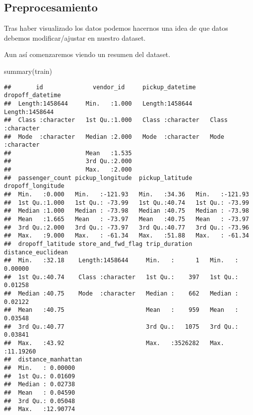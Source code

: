 \documentclass[
]{article}
\newenvironment{Shaded}{\begin{snugshade}}{\end{snugshade}}
\newcommand{\FunctionTok}[1]{\textcolor[rgb]{0.00,0.00,0.00}{#1}}
\newcommand{\NormalTok}[1]{#1}
\begin{document}
\hypertarget{preprocesamiento}{%
\subsection{Preprocesamiento}\label{preprocesamiento}}

Tras haber visualizado los datos podemos hacernos una idea de que datos
debemos modificar/ajustar en nuestro dataset.

Aun así comenzaremos viendo un resumen del dataset.

\begin{Shaded}
\begin{Highlighting}[]
\FunctionTok{summary}\NormalTok{(train)}
\end{Highlighting}
\end{Shaded}

\begin{verbatim}
##       id              vendor_id     pickup_datetime    dropoff_datetime  
##  Length:1458644     Min.   :1.000   Length:1458644     Length:1458644    
##  Class :character   1st Qu.:1.000   Class :character   Class :character  
##  Mode  :character   Median :2.000   Mode  :character   Mode  :character  
##                     Mean   :1.535                                        
##                     3rd Qu.:2.000                                        
##                     Max.   :2.000                                        
##  passenger_count pickup_longitude  pickup_latitude dropoff_longitude
##  Min.   :0.000   Min.   :-121.93   Min.   :34.36   Min.   :-121.93  
##  1st Qu.:1.000   1st Qu.: -73.99   1st Qu.:40.74   1st Qu.: -73.99  
##  Median :1.000   Median : -73.98   Median :40.75   Median : -73.98  
##  Mean   :1.665   Mean   : -73.97   Mean   :40.75   Mean   : -73.97  
##  3rd Qu.:2.000   3rd Qu.: -73.97   3rd Qu.:40.77   3rd Qu.: -73.96  
##  Max.   :9.000   Max.   : -61.34   Max.   :51.88   Max.   : -61.34  
##  dropoff_latitude store_and_fwd_flag trip_duration     distance_euclidean
##  Min.   :32.18    Length:1458644     Min.   :      1   Min.   : 0.00000  
##  1st Qu.:40.74    Class :character   1st Qu.:    397   1st Qu.: 0.01258  
##  Median :40.75    Mode  :character   Median :    662   Median : 0.02122  
##  Mean   :40.75                       Mean   :    959   Mean   : 0.03548  
##  3rd Qu.:40.77                       3rd Qu.:   1075   3rd Qu.: 0.03841  
##  Max.   :43.92                       Max.   :3526282   Max.   :11.19260  
##  distance_manhattan
##  Min.   : 0.00000  
##  1st Qu.: 0.01609  
##  Median : 0.02738  
##  Mean   : 0.04590  
##  3rd Qu.: 0.05048  
##  Max.   :12.90774
\end{verbatim}
\end{document}
